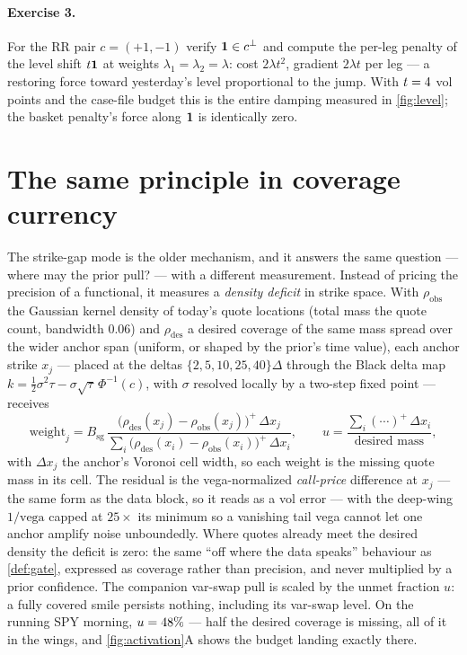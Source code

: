 \documentclass[11pt]{article}
\begin{document}
\paragraph{Exercise 3.}
For the RR pair $c=(+1,-1)$ verify $\mathbf{1}\in c^{\perp}$ and compute the
per-leg penalty of the level shift $t\mathbf{1}$ at weights
$\lambda_1=\lambda_2=\lambda$: cost $2\lambda t^2$, gradient
$2\lambda t$ per leg --- a restoring force toward yesterday's level
proportional to the jump.  With $t=4$ vol points and the
case-file budget this is the entire damping measured in
\cref{fig:level}; the basket penalty's force along $\mathbf{1}$ is
identically zero.

\section{The same principle in coverage currency}
\label{sec:coverage}

The strike-gap mode is the older mechanism, and it answers the same
question --- where may the prior pull? --- with a different
measurement.  Instead of pricing the precision of a functional, it
measures a \emph{density deficit} in strike space.  With
$\rho_{\mathrm{obs}}$ the Gaussian kernel density of today's quote
locations (total mass the quote count, bandwidth $0.06$) and
$\rho_{\mathrm{des}}$ a desired coverage of the same mass spread over
the wider anchor span (uniform, or shaped by the prior's time value),
each anchor strike $x_j$ --- placed at the deltas
$\{2,5,10,25,40\}\Delta$ through the Black delta map
$k=\tfrac12\sigma^2\tau-\sigma\sqrt\tau\,\Phi^{-1}(c)$, with $\sigma$
resolved locally by a two-step fixed point --- receives
\begin{equation}
\text{weight}_j
=B_{\mathrm{sg}}\,
\frac{\big(\rho_{\mathrm{des}}(x_j)-\rho_{\mathrm{obs}}(x_j)\big)^{+}
\,\Delta x_j}
{\sum_i\big(\rho_{\mathrm{des}}(x_i)-\rho_{\mathrm{obs}}(x_i)\big)^{+}
\,\Delta x_i},
\qquad
u=\frac{\sum_i(\cdots)^{+}\,\Delta x_i}{\text{desired mass}},
\label{eq:deficit}
\end{equation}
with $\Delta x_j$ the anchor's Voronoi cell width, so each weight is
the missing quote mass in its cell.  The residual is the
vega-normalized \emph{call-price} difference at $x_j$ --- the same
form as the data block, so it reads as a vol error --- with the
deep-wing $1/\text{vega}$ capped at $25\times$ its minimum so a
vanishing tail vega cannot let one anchor amplify noise unboundedly.
Where quotes already meet the desired density the deficit is zero:
the same ``off where the data speaks'' behaviour as \cref{def:gate},
expressed as coverage rather than precision, and never multiplied by
a prior confidence.  The companion var-swap pull is scaled by the
unmet fraction $u$: a fully covered smile persists nothing, including
its var-swap level.  On the running SPY morning,
$u=48\%$ --- half the desired coverage is missing, all of it
in the wings, and \cref{fig:activation}A shows the budget landing
exactly there.
\end{document}
